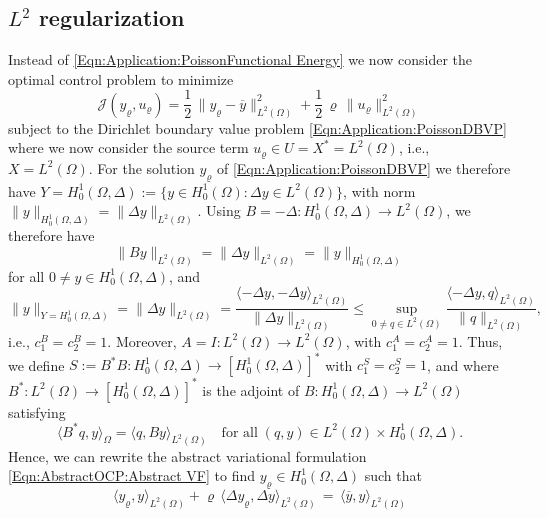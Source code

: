 \documentclass{article}
\numberwithin{equation}{section}
\begin{document}
%
%

\subsection{$L^2$ regularization}
%
Instead of \eqref{Eqn:Application:PoissonFunctional Energy} we now
consider the optimal control problem to minimize
\begin{equation}\label{Eqn:Application:PoissonFunctional L2}
  {\mathcal{J}}(y_\varrho,u_\varrho) =
  \frac{1}{2} \, \| y_\varrho - \overline{y} \|^2_{L^2(\Omega)} +
  \frac{1}{2} \, \varrho \, \| u_\varrho \|^2_{L^2(\Omega)}
\end{equation}
subject to the Dirichlet boundary value problem
\eqref{Eqn:Application:PoissonDBVP} where we now consider the source
term $u_\varrho \in U = X^* = L^2(\Omega)$, i.e., $X=L^2(\Omega)$.
For the solution $y_\varrho$ of \eqref{Eqn:Application:PoissonDBVP}
we therefore have $Y = H^1_0(\Omega,\Delta) := \{ y \in H^1_0(\Omega) :
\Delta y \in L^2(\Omega)\}$, with norm
$\| y \|_{H^1_0(\Omega,\Delta)} = \| \Delta y \|_{L^2(\Omega)}$. 
Using $B = - \Delta : H^1_0(\Omega,\Delta) \to L^2(\Omega)$, 
we therefore have
%
\[
  \| B y \|_{L^2(\Omega)} = \| \Delta y \|_{L^2(\Omega)} =
  \| y \|_{H^1_0(\Omega,\Delta)} 
\]
%
for all $ 0 \neq y \in H_0^1(\Omega,\Delta)$,
and
\[
  \| y \|_{Y=H_0^1(\Omega,\Delta)} =
  \| \Delta y \|_{L^2(\Omega)} =
  \frac{\langle - \Delta y , - \Delta y \rangle_{L^2(\Omega)}}
  {\| \Delta y \|_{L^2(\Omega)}} \leq
  \sup\limits_{0 \neq q \in L^2(\Omega)}
  \frac{\langle - \Delta y , q \rangle_{L^2(\Omega)}}{\| q \|_{L^2(\Omega)}},
\]
i.e., $c_1^B = c_2^B = 1$. Moreover, $A = I : L^2(\Omega) \to L^2(\Omega)$,
with $ c_1^A = c_2^A = 1$. 
Thus, we define
$S := B^* B : H^1_0(\Omega,\Delta) \to [H^1_0(\Omega,\Delta)]^*$
with $c_1^S = c_2^S = 1$, and where
$B^* : L^2(\Omega) \to [H^1_0(\Omega,\Delta)]^*$ is the adjoint of
$B : H^1_0(\Omega,\Delta) \to L^2(\Omega)$ satisfying
\[
  \langle B^* q , y \rangle_\Omega
  = \langle q , By \rangle_{L^2(\Omega)} \quad
  \mbox{for all} \; (q,y) \in L^2(\Omega) \times H^1_0(\Omega,\Delta).
\]
Hence, we can rewrite the abstract variational formulation
\eqref{Eqn:AbstractOCP:Abstract VF} to find
$y_\varrho \in H^1_0(\Omega,\Delta)$ such that
\begin{equation}\label{Eqn:Application:VF L2}
  \langle y_\varrho , y \rangle_{L^2(\Omega)} + \varrho \,
  \langle \Delta y_\varrho , \Delta y \rangle_{L^2(\Omega)} \, = \,
  \langle \overline{y} , y \rangle_{L^2(\Omega)}
\end{equation}
\end{document}
